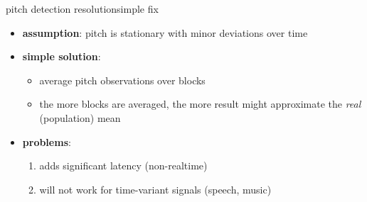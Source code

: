         \begin{frame}{pitch detection resolution}{simple fix}
            \begin{itemize}
                \item   \textbf{assumption}: pitch is stationary with minor deviations over time
                \bigskip
                \item<2-> \textbf{simple solution}: 
                    \begin{itemize}
                        \item   average pitch observations over blocks
                        \item   the more blocks are averaged, the more result might approximate the \textit{real} (population) mean
                    \end{itemize}
                \bigskip
                \item<3->   \textbf{problems}:
                    \begin{enumerate}
                        \item   adds significant latency (non-realtime)
                        \item   will not work for time-variant signals (speech, music)
                    \end{enumerate}
            \end{itemize}
        \end{frame}
    
